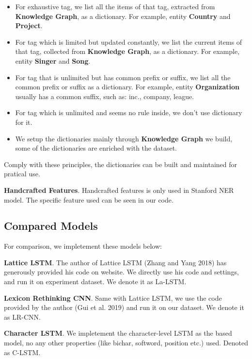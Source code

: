 \documentclass[letterpaper]{article} %
\begin{document}
\begin{itemize}
\item For exhaustive tag, we list all the items of that tag, extracted from \textbf{Knowledge Graph}, as a dictionary. For example, entity \textbf{Country} and \textbf{Project}.
\item For tag which is limited but updated constantly, we list the current items of that tag, collected from \textbf{Knowledge Graph}, as a dictionary. For example, entity \textbf{Singer} and \textbf{Song}.
\item For tag that is unlimited but has common prefix or suffix, we list all the common prefix or suffix as a dictionary. For example, entity \textbf{Organization} usually has a common suffix, such as: inc., company, league.
\item For tag which is unlimited and seems no rule inside, we don't use dictionary for it.
\item We setup the dictionaries mainly through \textbf{Knowledge Graph} we build, some of the dictionaries are enriched with the dataset.
\end{itemize}

Comply with these principles, the dictionaries can be built and maintained for pratical use.

\textbf{Handcrafted Features}. Handcrafted features is only used in Stanford NER model. The specific feature used can be seen in our code.




\subsection{Compared Models}





For comparison, we impletement these models below:

\textbf{Lattice LSTM}. The author of Lattice LSTM (Zhang and Yang 2018) has generously provided his code on website. We directly use his code and settings, and run it on experiment dataset. We denote it as La-LSTM.

\textbf{Lexicon Rethinking CNN}. Same with Lattice LSTM, we use the code provided by the author (Gui et al. 2019) and run it on our dataset. We denote it as LR-CNN.

\textbf{Character LSTM}. We impletement the character-level LSTM as the based model, no any other properties (like bichar, softword, position etc.) used. Denoted as C-LSTM.
\end{document}
